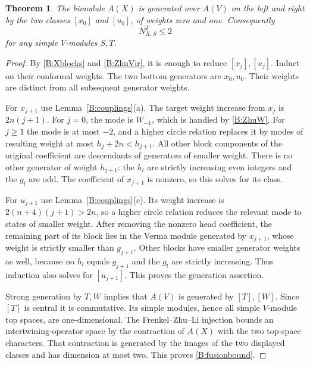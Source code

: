 \documentclass[11pt]{article}
\newtheorem{theorem}{Theorem}[section]
\numberwithin{equation}{section}
\begin{document}
\begin{theorem}\label{B:twogen}
The bimodule $A(X)$ is generated over $A(V)$ on the left and right by the two classes $[x_0]$ and $[u_0]$, of weights zero and one. Consequently
\begin{equation}\label{B:fusionbound}
 N_{X,S}^{T}\leq2
\end{equation}
for any simple $V$-modules $S,T$.
\end{theorem}
\begin{proof}
By \eqref{B:Xblocks} and \eqref{B:ZhuVir}, it is enough to reduce $[x_j],[u_j]$. Induct on their conformal weights. The two bottom generators are $x_0,u_0$. Their weights are distinct from all subsequent generator weights.

For $x_{j+1}$ use Lemma~\ref{B:couplings}(a). The target weight increase from $x_j$ is $2n(j+1)$. For $j=0$, the mode is $W_{-1}$, which is handled by \eqref{B:ZhuW}. For $j\geq1$ the mode is at most $-2$, and a higher circle relation replaces it by modes of resulting weight at most $h_j+2n<h_{j+1}$. All other block components of the original coefficient are descendants of generators of smaller weight. There is no other generator of weight $h_{j+1}$: the $h_l$ are strictly increasing even integers and the $g_l$ are odd. The coefficient of $x_{j+1}$ is nonzero, so this solves for its class.

For $u_{j+1}$ use Lemma~\ref{B:couplings}(c). Its weight increase is $2(n+4)(j+1)>2n$, so a higher circle relation reduces the relevant mode to states of smaller weight. After removing the nonzero head coefficient, the remaining part of its block lies in the Verma module generated by $x_{j+1}$, whose weight is strictly smaller than $g_{j+1}$. Other blocks have smaller generator weights as well, because no $h_l$ equals $g_{j+1}$ and the $g_l$ are strictly increasing. Thus induction also solves for $[u_{j+1}]$. This proves the generation assertion.

Strong generation by $T,W$ implies that $A(V)$ is generated by $[T],[W]$. Since $[T]$ is central it is commutative. Its simple modules, hence all simple $V$-module top spaces, are one-dimensional. The Frenkel--Zhu--Li injection \cite[Theorem 2.12]{A:AA} bounds an intertwining-operator space by the contraction of $A(X)$ with the two top-space characters. That contraction is generated by the images of the two displayed classes and has dimension at most two. This proves \eqref{B:fusionbound}.
\end{proof}
\end{document}
